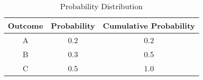 

\begin{table}[h]
\centering
\begin{tabular}{|c|c|c|}
\hline
Outcome & Probability & Cumulative Probability \\
\hline
A & 0.2 & 0.2 \\
B & 0.3 & 0.5 \\
C & 0.5 & 1.0 \\
\hline
\end{tabular}
\caption{Probability Distribution}
\label{tab:probability}
\end{table}

